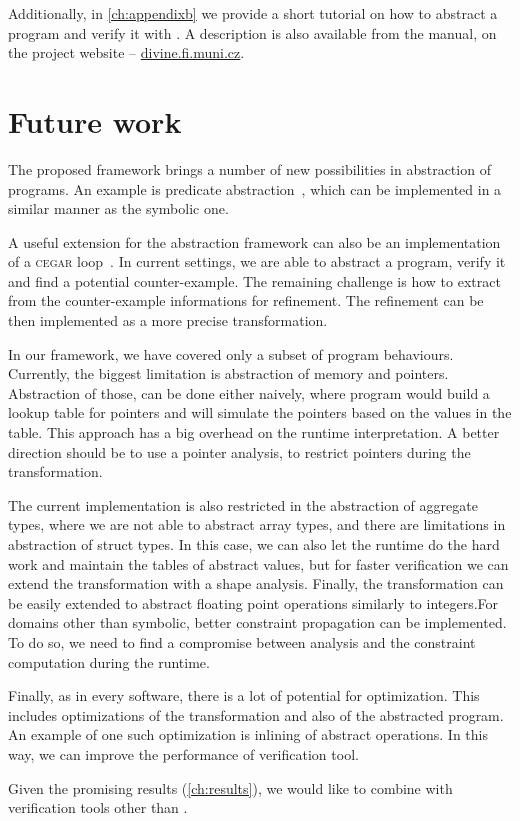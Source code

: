 Additionally, in \autoref{ch:appendixb} we provide a short tutorial on how to
abstract a program and verify it with \DIVINE. A description is also
available from the manual, on the project website -- \url{divine.fi.muni.cz}.

\section{Future work}

The proposed framework brings a number of new possibilities in abstraction of
programs. An example is predicate abstraction~\cite{Flanagan02}, which can be
implemented in a similar manner as the symbolic one.

A useful extension for the abstraction framework can also be an implementation
of a \textsc{cegar} loop~\cite{Clarke20}. In current settings, we are able to
abstract a program, verify it and find a potential counter-example. The
remaining challenge is how to extract from the counter-example informations
for refinement. The refinement can be then implemented as a more precise
transformation.

In our framework, we have covered only a subset of program behaviours.
Currently, the biggest limitation is abstraction of memory and pointers.
Abstraction of those, can be done either naively, where program would build
a lookup table for pointers and will simulate the pointers based
on the values in the table. This approach has a big overhead on the runtime
interpretation. A better direction should be to use a pointer analysis, to
restrict pointers during the transformation.

The current implementation is also restricted in the abstraction of aggregate
types, where we are not able to abstract array types, and there are limitations
in abstraction of struct types. In this case, we can also let the runtime do the
hard work and maintain the tables of abstract values, but for faster
verification we can extend the transformation with a shape analysis. Finally,
the transformation can be easily extended to abstract floating
point operations similarly to integers.For domains other than
symbolic, better constraint propagation can be implemented. To do
so, we need to find a compromise between analysis and the
constraint computation during the runtime.

Finally, as in every software, there is a lot of potential for optimization.
This includes optimizations of the transformation and also of the abstracted program.
An example of one such optimization is inlining of abstract operations. In this
way, we can improve the performance of verification tool.

Given the promising results (\autoref{ch:results}), we would like to combine
\LART with verification tools other than \DIVINE.
